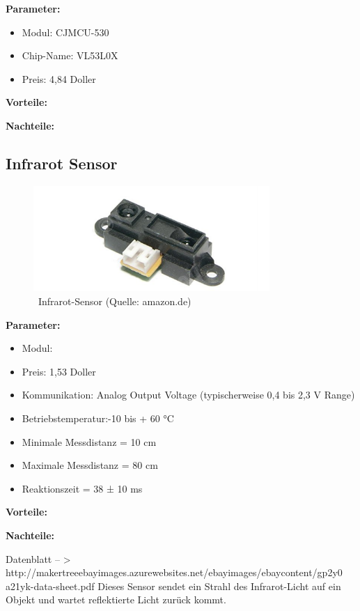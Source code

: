 \textbf{Parameter:}  %

\begin{itemize}
\item Modul: CJMCU-530
\item Chip-Name: VL53L0X
\item Preis: 4,84 Doller
\end{itemize}

\par\bigskip %
\textbf{Vorteile:}  %

\par\bigskip %
\textbf{Nachteile:}  %

\subsection{Infrarot Sensor}

\begin{figure}[ht]  %
	\centering\includegraphics[width=0.8\textwidth]{images/infrarot.png}
	\caption{ \ Infrarot-Sensor  (Quelle: amazon.de)}
	\label{infrarot} %
\end{figure}

\textbf{Parameter:}  %

\begin{itemize}
\item Modul: 
\item Preis: 1,53 Doller
\item Kommunikation: Analog Output Voltage (typischerweise 0,4 bis 2,3 V Range)
\item Betriebstemperatur:-10 bis + 60 °C
\item Minimale Messdistanz = 10 cm
\item Maximale Messdistanz = 80 cm
\item Reaktionszeit = 38 ± 10 ms
\end{itemize}

\par\bigskip %
\textbf{Vorteile:}  %

\par\bigskip %
\textbf{Nachteile:}  %

Datenblatt – > http://makertreeebayimages.azurewebsites.net/ebayimages/ebaycontent/gp2y0 a21yk-data-sheet.pdf 
Dieses Sensor sendet ein Strahl des Infrarot-Licht auf ein Objekt und wartet  reflektierte Licht zurück kommt.